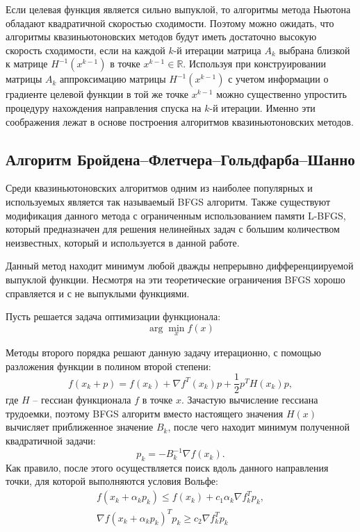 Если целевая функция является сильно выпуклой, то алгоритмы метода Ньютона 
обладают квадратичной скоростью сходимости. Поэтому можно ожидать, что 
алгоритмы квазиньютоновских методов будут иметь достаточно высокую скорость 
сходимости, если на каждой \( k \)-й итерации матрица \( A_k \) выбрана 
близкой к матрице \( H^{-1}(x^{k-1}) \) в точке \( x^{k-1} \in \mathbb{R} \). 
Используя при конструировании матрицы \( A_k \) аппроксимацию матрицы 
\( H^{-1}(x^{k-1}) \) с учетом информации о градиенте целевой функции в той же 
точке \( x^{k-1} \) можно существенно упростить процедуру нахождения 
направления спуска на \( k \)-й итерации. Именно эти соображения лежат в 
основе построения алгоритмов квазиньютоновских методов.\cite{bib:methods}

\subsection{Алгоритм Бройдена--Флетчера--Гольдфарба--Шанно}

Среди квазиньютоновских алгоритмов одним из наиболее популярных и используемых 
является так называемый BFGS алгоритм. Также существуют модификация данного 
метода с ограниченным использованием памяти L-BFGS, который предназначен для 
решения нелинейных задач с большим количеством неизвестных, который и 
используется в данной работе.

Данный метод находит минимум любой дважды непрерывно дифференциируемой 
выпуклой функции. Несмотря на эти теоретические ограничения BFGS хорошо 
справляется и с не выпуклыми функциями.

Пусть решается задача оптимизации функционала:
\[ 
    \arg\min_x f(x) 
\]

Методы второго порядка решают данную задачу итерационно, с помощью разложения 
функции в полином второй степени:
\[ 
    f(x_k + p) = f(x_k) + \nabla f^T(x_k) p + \frac{1}{2} p^T H(x_k) p, 
\]
где \( H \) -- гессиан функционала \( f \) в точке \( x \). Зачастую 
вычисление гессиана трудоемки, поэтому BFGS алгоритм вместо настоящего 
значения \( H(x) \) вычисляет приближенное значение \( B_k \), после чего 
находит минимум полученной квадратичной задачи:
\[ 
    p_k = - B_k^{-1}\nabla f(x_k). 
\]
Как правило, после этого осуществляется поиск вдоль данного направления точки, 
для которой выполняются условия Вольфе:
\begin{gather}
    f(x_k + \alpha_k p_k) \leq f(x_k) + c_1 \alpha_k \nabla f_k^T p_k, 
    \nonumber \\
    \nabla f(x_k + \alpha_k p_k)^T p_k \geq c_2 \nabla f_k^T p_k
    \label{eq:wolfe}
\end{gather}

